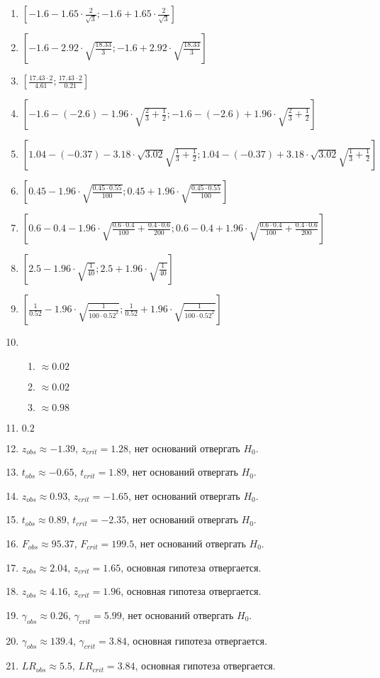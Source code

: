 \begin{enumerate}
\item $\left[-1.6 - 1.65 \cdot \frac{2}{\sqrt{3}}; -1.6 + 1.65 \cdot \frac{2}{\sqrt{3}} \right]$
\item $\left[-1.6 - 2.92 \cdot \sqrt{\frac{18.33}{3}}; -1.6 + 2.92 \cdot \sqrt{\frac{18.33}{3}} \right]$
\item $\left[\frac{17.43 \cdot 2}{4.61}; \frac{17.43 \cdot 2}{0.21} \right]$
\item $\left[-1.6 - (-2.6) - 1.96 \cdot \sqrt{\frac{2}{3} + \frac{1}{2}}; -1.6 - (-2.6) + 1.96 \cdot \sqrt{\frac{2}{3} + \frac{1}{2}} \right]$
\item $\left[1.04 - (-0.37) - 3.18 \cdot \sqrt{3.02} \sqrt{\frac{1}{3} + \frac{1}{2}}; 1.04 - (-0.37) + 3.18 \cdot \sqrt{3.02} \sqrt{\frac{1}{3} + \frac{1}{2}} \right]$
\item $\left[0.45 - 1.96 \cdot \sqrt{\frac{0.45 \cdot 0.55}{100}}; 0.45 + 1.96 \cdot \sqrt{\frac{0.45 \cdot 0.55}{100}} \right]$
\item $\left[0.6 - 0.4 - 1.96  \cdot \sqrt{\frac{0.6\cdot0.4}{100} + \frac{0.4 \cdot 0.6}{200}}; 0.6 - 0.4 + 1.96 \cdot \sqrt{\frac{0.6\cdot0.4}{100} + \frac{0.4 \cdot 0.6}{200}} \right]$
\item $\left[2.5 - 1.96 \cdot \sqrt{\frac{1}{40}}; 2.5 + 1.96 \cdot \sqrt{\frac{1}{40}} \right]$
\item $\left[\frac{1}{0.52} - 1.96 \cdot \sqrt{\frac{1}{100 \cdot 0.52^2}}; \frac{1}{0.52} + 1.96 \cdot \sqrt{\frac{1}{100 \cdot 0.52^2}} \right]$
\item
\begin{enumerate}
\item $\approx 0.02$
\item $\approx 0.02$
\item $\approx 0.98$
\end{enumerate}
\item $0.2$
\item $z_{obs} \approx -1.39 $, $z_{crit} = 1.28$, нет оснований отвергать $H_0$.
\item $t_{obs} \approx -0.65$, $t_{crit} = 1.89$, нет оснований отвергать $H_0$.
\item $z_{obs} \approx 0.93$, $z_{crit} = -1.65$, нет оснований отвергать $H_0$.
\item $t_{obs} \approx 0.89$, $t_{crit} = -2.35$, нет оснований отвергать $H_0$.
\item $F_{obs} \approx 95.37$, $F_{crit} = 199.5$, нет оснований отвергать $H_0$.
\item $z_{obs} \approx 2.04$, $z_{crit} = 1.65$, основная гипотеза отвергается.
\item $z_{obs} \approx 4.16$, $z_{crit} = 1.96$, основная гипотеза отвергается.
\item $\gamma_{obs} \approx 0.26$, $\gamma_{crit} = 5.99$, нет оснований отвергать $H_0$.
\item $\gamma_{obs} \approx 139.4$, $\gamma_{crit} = 3.84$, основная гипотеза отвергается.
\item $LR_{obs} \approx 5.5$, $LR_{crit} = 3.84$, основная гипотеза отвергается.
\end{enumerate}
